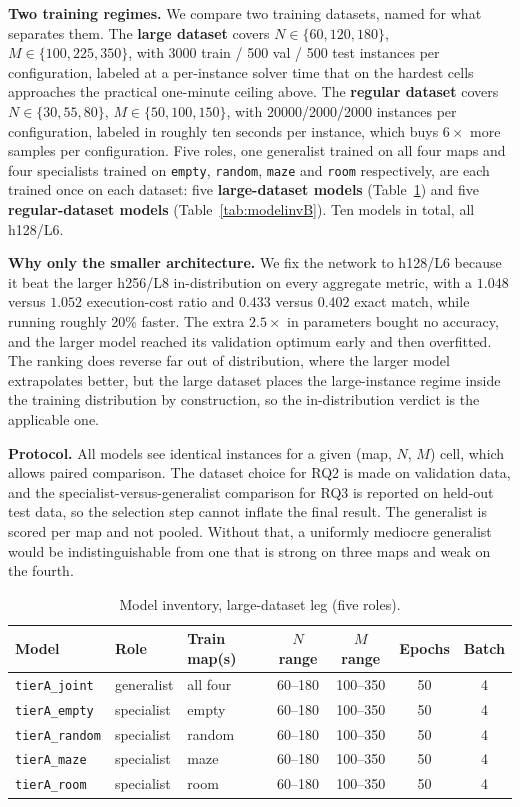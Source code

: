 \documentclass[11pt,a4paper]{article}
\begin{document}
\textbf{Two training regimes.} We compare two training datasets, named for what separates them. The
\textbf{large dataset} covers $N\in\{60,120,180\}$, $M\in\{100,225,350\}$, with 3000 train / 500 val
/ 500 test instances per configuration, labeled at a per-instance solver time that on the hardest
cells approaches the practical one-minute ceiling above. The \textbf{regular dataset} covers
$N\in\{30,55,80\}$, $M\in\{50,100,150\}$, with 20000/2000/2000 instances per configuration, labeled
in roughly ten seconds per instance, which buys $6\times$ more samples per configuration. Five
roles, one generalist trained on all four maps and four specialists trained on \texttt{empty},
\texttt{random}, \texttt{maze} and \texttt{room} respectively, are each trained once on each dataset:
five \textbf{large-dataset models} (Table~\ref{tab:modelinv}) and five \textbf{regular-dataset
models} (Table~\ref{tab:modelinvB}). Ten models in total, all h128/L6.

\textbf{Why only the smaller architecture.} We fix the network to h128/L6 because it beat the larger
h256/L8 in-distribution on every aggregate metric, with a $1.048$ versus $1.052$ execution-cost
ratio and $0.433$ versus $0.402$ exact match, while running roughly 20\% faster. The extra
$2.5\times$ in parameters bought no accuracy, and the larger model reached its validation optimum
early and then overfitted. The ranking does reverse far out of distribution, where the larger model
extrapolates better, but the large dataset places the large-instance regime inside the training distribution
by construction, so the in-distribution verdict is the applicable one.

\textbf{Protocol.} All models see identical instances for a given (map, $N$, $M$) cell, which allows
paired comparison. The dataset choice for RQ2 is made on validation data, and the
specialist-versus-generalist comparison for RQ3 is reported on held-out test data, so the selection
step cannot inflate the final result. The generalist is scored per map and not pooled. Without
that, a uniformly mediocre generalist would be indistinguishable from one that is strong on three
maps and weak on the fourth.

\begin{table}[htbp]
\centering
\caption{Model inventory, large-dataset leg (five roles).}
\small
\begin{tabularx}{\textwidth}{llXcccc}
\toprule
Model & Role & Train map(s) & $N$ range & $M$ range & Epochs & Batch \\
\midrule
\texttt{tierA\_joint}   & generalist & all four & 60--180 & 100--350 & 50 & 4 \\
\texttt{tierA\_empty}   & specialist & empty & 60--180 & 100--350 & 50 & 4 \\
\texttt{tierA\_random}  & specialist & random & 60--180 & 100--350 & 50 & 4 \\
\texttt{tierA\_maze}    & specialist & maze & 60--180 & 100--350 & 50 & 4 \\
\texttt{tierA\_room}    & specialist & room & 60--180 & 100--350 & 50 & 4 \\
\bottomrule
\end{tabularx}
\label{tab:modelinv}
\end{table}
\end{document}
